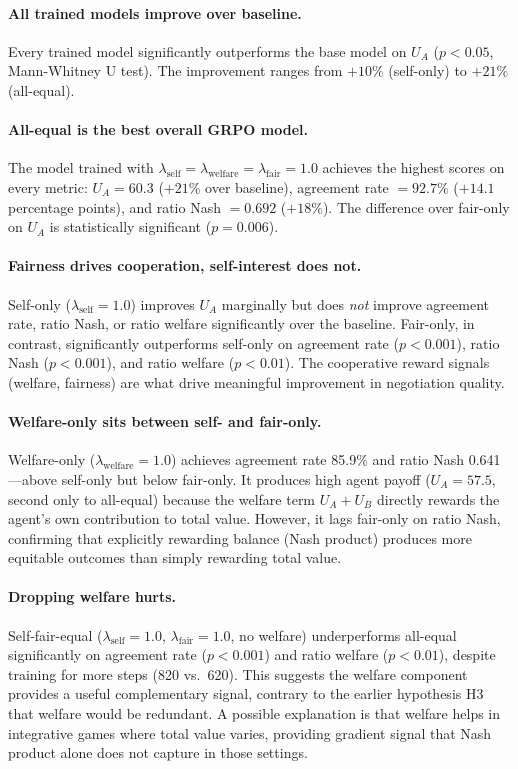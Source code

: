 \documentclass[12pt,a4paper]{article}
\begin{document}
\paragraph{All trained models improve over baseline.} Every trained model significantly outperforms the base model on $U_A$ ($p < 0.05$, Mann-Whitney U test). The improvement ranges from $+10\%$ (self-only) to $+21\%$ (all-equal).

\paragraph{All-equal is the best overall GRPO model.} The model trained with $\lambda_{\text{self}} = \lambda_{\text{welfare}} = \lambda_{\text{fair}} = 1.0$ achieves the highest scores on every metric: $U_A = 60.3$ ($+21\%$ over baseline), agreement rate $= 92.7\%$ ($+14.1$ percentage points), and ratio Nash $= 0.692$ ($+18\%$). The difference over fair-only on $U_A$ is statistically significant ($p = 0.006$).

\paragraph{Fairness drives cooperation, self-interest does not.} Self-only ($\lambda_{\text{self}} = 1.0$) improves $U_A$ marginally but does \emph{not} improve agreement rate, ratio Nash, or ratio welfare significantly over the baseline. Fair-only, in contrast, significantly outperforms self-only on agreement rate ($p < 0.001$), ratio Nash ($p < 0.001$), and ratio welfare ($p < 0.01$). The cooperative reward signals (welfare, fairness) are what drive meaningful improvement in negotiation quality.

\paragraph{Welfare-only sits between self- and fair-only.} Welfare-only ($\lambda_{\text{welfare}} = 1.0$) achieves agreement rate 85.9\% and ratio Nash 0.641---above self-only but below fair-only. It produces high agent payoff ($U_A = 57.5$, second only to all-equal) because the welfare term $U_A + U_B$ directly rewards the agent's own contribution to total value. However, it lags fair-only on ratio Nash, confirming that explicitly rewarding balance (Nash product) produces more equitable outcomes than simply rewarding total value.

\paragraph{Dropping welfare hurts.} Self-fair-equal ($\lambda_{\text{self}} = 1.0$, $\lambda_{\text{fair}} = 1.0$, no welfare) underperforms all-equal significantly on agreement rate ($p < 0.001$) and ratio welfare ($p < 0.01$), despite training for more steps (820 vs.\ 620). This suggests the welfare component provides a useful complementary signal, contrary to the earlier hypothesis H3 that welfare would be redundant. A possible explanation is that welfare helps in integrative games where total value varies, providing gradient signal that Nash product alone does not capture in those settings.
\end{document}
